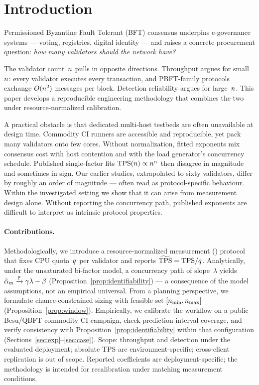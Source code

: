 \section{Introduction}
\label{sec:intro}

Permissioned Byzantine Fault Tolerant (BFT) consensus underpins e-governance
systems --- voting, registries, digital identity --- and raises a concrete
procurement question: \emph{how many validators should the network have?}

The validator count~$n$ pulls in opposite directions. Throughput argues for
small~$n$: every validator executes every transaction, and PBFT-family
protocols exchange $O(n^{2})$ messages per block. Detection reliability argues
for large~$n$. This paper develops a reproducible engineering methodology that
combines the two under resource-normalized calibration.

A practical obstacle is that dedicated multi-host testbeds are often
unavailable at design time. Commodity CI runners are accessible and
reproducible, yet pack many validators onto few cores. Without normalization,
fitted exponents mix consensus cost with host contention and with the load
generator's concurrency schedule. Published single-factor fits
$\mathrm{TPS}(n)\propto n^{\alpha}$ then disagree in magnitude and sometimes in sign.
Our earlier studies, extrapolated to sixty validators, differ by roughly an
order of magnitude --- often read as protocol-specific behaviour. Within the
investigated setting we show that it can arise from measurement design alone.
Without reporting the concurrency path, published exponents are difficult to
interpret as intrinsic protocol properties.

\paragraph{Contributions.}
Methodologically, we introduce a resource-normalized measurement (\RNM{})
protocol that fixes CPU quota~$q$ per validator and reports
$\widetilde{\mathrm{TPS}}=\mathrm{TPS}/q$. Analytically, under the unsaturated bi-factor model, a
concurrency path of slope~$\lambda$ yields
$\hat{\alpha}_{m}\xrightarrow{\mathbb{P}}\gamma\lambda-\beta$
(Proposition~\ref{prop:identifiability}) --- a consequence of the model
assumptions, not an empirical universal. From a planning perspective, we
formulate chance-constrained sizing with feasible set $[\nmin,\nmax]$
(Proposition~\ref{prop:window}). Empirically, we calibrate the workflow on a
public Besu/QBFT commodity-CI campaign, check prediction-interval coverage, and
verify consistency with Proposition~\ref{prop:identifiability} within that
configuration (Sections~\ref{sec:exp}--\ref{sec:case}).
Scope: throughput and detection under the evaluated deployment; absolute TPS
are environment-specific; cross-client replication is out of scope. Reported
coefficients are deployment-specific; the methodology is intended for
recalibration under matching measurement conditions.
